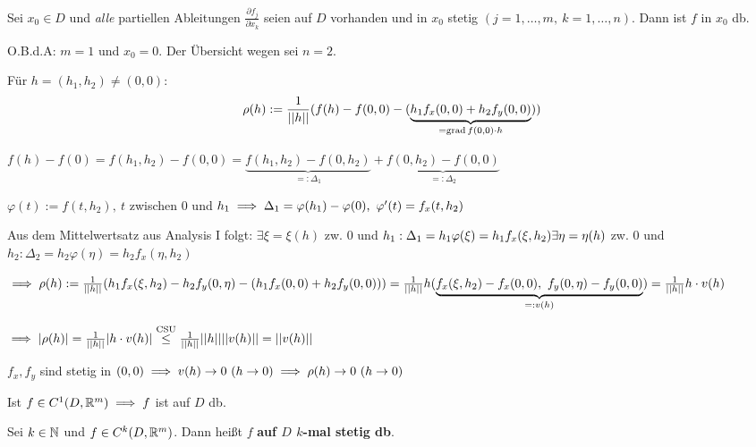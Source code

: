 \documentclass[a4paper,twoside,DIV15,BCOR12mm]{scrbook}
\begin{document}
\begin{satz}
Sei $x_0 \in D$ und \emph{alle} partiellen Ableitungen $\frac{\partial f_j}{\partial x_k}$ seien auf $D$ vorhanden und in $x_0$ stetig $(j=1,\ldots,m,\ k=1,\ldots,n)$. Dann ist $f$ in $x_0$ db.
\end{satz}

\begin{beweis}
O.B.d.A: $m=1$ und $x_0=0$. Der Übersicht wegen sei $n=2$.

Für $h = (h_1,h_2) \ne (0,0):$ $$\rho(h) := \frac{1}{||h||}(f(h) - f(0,0) - (\underbrace{h_1 f_x(0,0) + h_2 f_y(0,0)}_{= \mathop{\rm grad}\nolimits f(0,0)\cdot h}))$$

$f(h) - f(0) = f(h_1,h_2) - f(0,0) = \underbrace{f(h_1,h_2) - f(0,h_2)}_{=:\Delta_1} + \underbrace{f(0,h_2) - f(0,0)}_{=:\Delta_2}$

$\varphi(t) := f(t,h_2),\ t$ zwischen $0$ und $h_1 \implies \Delta_1 = \varphi(h_1) - \varphi(0),\ \varphi'(t) = f_x(t,h_2)$

Aus dem Mittelwertsatz aus Analysis I folgt:
$\exists \xi = \xi(h)$ zw. $0$ und $h_1: \Delta_1 = h_1\varphi(\xi) = h_1 f_x(\xi,h_2)\\
\exists \eta = \eta(h)$ zw. $0$ und $h_2: \Delta_2 = h_2\varphi(\eta) = h_2 f_x(\eta,h_2)$

$\implies \rho(h) := \frac{1}{||h||}(h_1 f_x(\xi,h_2) - h_2 f_y(0,\eta) - (h_1 f_x(0,0) + h_2 f_y(0,0)))\\
= \frac{1}{||h||} h(\underbrace{f_x(\xi,h_2) - f_x(0,0),\ f_y(0,\eta) - f_y(0,0)}_{=:v(h)})
= \frac{1}{||h||} h\cdot v(h)$

$\implies |\rho(h)| = \frac{1}{||h||} |h\cdot v(h)| \overset{\text{CSU}}{\le} \frac{1}{||h||} ||h|| ||v(h)|| = ||v(h)||$

$f_x,f_y$ sind stetig in $(0,0) \implies v(h) \to 0\ (h \to 0) \implies \rho(h) \to 0\ (h \to 0)$
\end{beweis}

\begin{folgerung}
Ist $f \in C^1(D,\mathbb{R}^m) \implies f$ ist auf $D$ db.
\end{folgerung}

\begin{definition*}
Sei $k \in \mathbb{N}$ und $f \in C^k(D,\mathbb{R}^m)$. Dann heißt $f$ \textbf{auf $D$ $k$-mal stetig db}.
\end{definition*}
\end{document}
